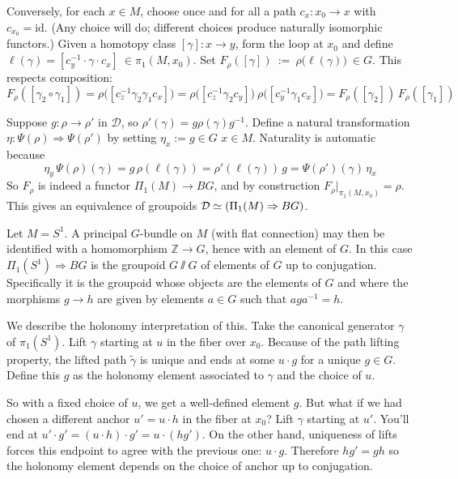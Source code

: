 \documentclass[12pt]{article}
\begin{document}
\begin{example}[Connected $M$]
    Conversely, for each $x\in M$, choose once and for all a path $c_x:x_0\to x$ with $c_{x_0}=\mathrm{id}$. (Any choice will do; different choices produce naturally isomorphic functors.) Given a homotopy class $[\gamma]:x\to y$, form the loop at $x_0$ and define $\ell(\gamma) = [c_y^{-1}\cdot \gamma \cdot c_x]\ \in \pi_1(M,x_0)$.
    Set
    $F_\rho([\gamma])\ :=\ \rho\big(\ell(\gamma)\big)\ \in G$.
    This respects composition:
    \[F_\rho([\gamma_2\circ\gamma_1])
        = \rho\big([c_z^{-1}\gamma_2\gamma_1 c_x]\big)
        = \rho\big([c_z^{-1}\gamma_2 c_y]\big)\ \rho\big([c_y^{-1}\gamma_1 c_x]\big)
        = F_\rho([\gamma_2])\,F_\rho([\gamma_1])\]

    Suppose $g:\rho\to\rho'$ in $\mathcal{D}$, so $\rho'(\gamma)=g \rho(\gamma) g^{-1}$.
    Define a natural transformation $\eta:\Psi(\rho)\Rightarrow \Psi(\rho')$ by setting
    $\eta_x := g \in G$ \quad {} $x\in M$.
    Naturality is automatic because
    \[\eta_y\,\Psi(\rho)(\gamma) = g\,\rho(\ell(\gamma)) = \rho'(\ell(\gamma))\,g = \Psi(\rho')(\gamma)\,\eta_x\] So $F_\rho$ is indeed a functor $\Pi_1(M)\to BG$, and by construction $F_\rho\big|_{\pi_1(M,x_0)}=\rho$. This gives an equivalence of groupoids ${\mathcal{D}} \simeq (\Pi_1(M)\Rightarrow BG)$.
\end{example}


\begin{example}
    Let $M = S^1$. A principal $G$-bundle on $M$ (with flat connection) may then be identified with a homomorphism $\mathbb{Z} \to G$, hence with an element of $G$. In this case $\Pi_1(S^1) \Rightarrow BG$ is the groupoid $G\sslash G$ of elements of $G$ up to conjugation. Specifically it is the groupoid whose objects are the elements of $G$ and where the morphisms $g \to h$ are given by elements $a \in G$ such that $a g a^{-1} = h$.

We describe the holonomy interpretation of this. Take the canonical generator $\gamma$ of $\pi_1(S^1)$. Lift $\gamma$ starting at $u$ in the fiber over $x_0$. Because of the path lifting property, the lifted path $\tilde\gamma$ is unique and ends at some $u\cdot g$ for a unique $g\in G$. Define this $g$ as the holonomy element associated to $\gamma$ and the choice of $u$.

    So with a fixed choice of $u$, we get a well-defined element $g$. But what if we had chosen a different anchor $u' = u\cdot h$ in the fiber at $x_0$? Lift $\gamma$ starting at $u'$. You'll end at $u' \cdot g' = (u\cdot h)\cdot g' = u\cdot (h g')$. On the other hand, uniqueness of lifts forces this endpoint to agree with the previous one: $u\cdot g$. Therefore $h g' = g h$ so the holonomy element depends on the choice of anchor up to conjugation.
\end{example}
\end{document}
